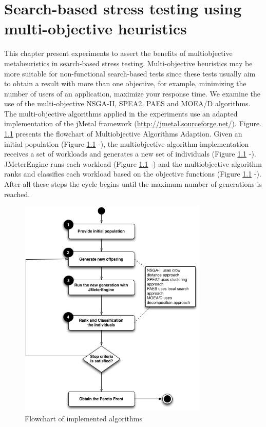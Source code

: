 \documentclass[espaco=umemeio,chapter=TITLE,twoside,openright]{abnt}
\begin{document}
\chapter{Search-based stress testing using multi-objective heuristics}

This chapter present experiments to assert the benefits of multiobjective metaheuristics in search-based stress testing. Multi-objective heuristics may be more suitable for non-functional search-based tests since these tests usually aim to obtain a result with more than one objective, for example, minimizing the number of users of an application, maximize your response time. We examine the use of the multi-objective NSGA-II, SPEA2, PAES and MOEA/D algorithms. The multi-objective algorithms applied in the experiments use an adapted implementation of the jMetal framework (\url{http://jmetal.sourceforge.net/}). Figure. \ref{fig:flowchart} presents the flowchart of  Multiobjective Algorithms Adaption. Given an initial population (Figure \ref{fig:flowchart}  -),  the multiobjective algorithm implementation receives a set of workloads  and generates a new set of individuals  (Figure \ref{fig:flowchart}  -).  JMeterEngine runs each workload (Figure \ref{fig:flowchart}  -) and the multiobjective algorithm ranks and classifies each workload based on the objective functions  (Figure \ref{fig:flowchart}  -).  After all these steps the cycle begins until the maximum number of generations is reached.

\begin{figure}[!h]
\centering
\includegraphics[width=0.8\textwidth]{./images/step3.png}
\caption{Flowchart of implemented algorithms}
\label{fig:flowchart}
\end{figure}
\end{document}

